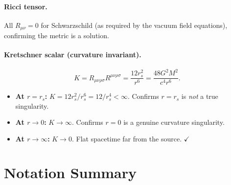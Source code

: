 \documentclass[12pt,a4paper]{article}
\theoremstyle{plain}
\theoremstyle{definition}
\theoremstyle{remark}
\begin{document}
\paragraph{Ricci tensor.} All $R_{\mu\nu}=0$ for Schwarzschild (as required by the vacuum field equations), confirming the metric is a solution.

\paragraph{Kretschner scalar (curvature invariant).}
\[
  K = R_{\mu\nu\rho\sigma}R^{\mu\nu\rho\sigma}
  = \frac{12r_s^2}{r^6}
  = \frac{48G^2M^2}{c^4r^6}.
\]
\begin{itemize}
  \item \textbf{At $r=r_s$:} $K = 12r_s^2/r_s^6 = 12/r_s^4 < \infty$. Confirms $r=r_s$ is \textit{not} a true singularity.
  \item \textbf{At $r\to0$:} $K\to\infty$. Confirms $r=0$ is a genuine curvature singularity.
  \item \textbf{At $r\to\infty$:} $K\to0$. Flat spacetime far from the source. $\checkmark$
\end{itemize}

\section*{Notation Summary}
\end{document}
